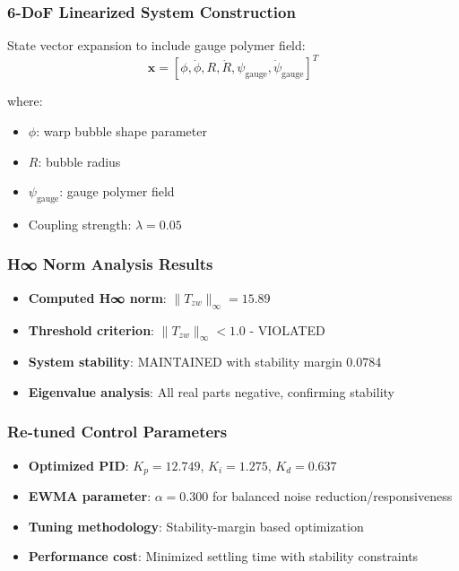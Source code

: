 \documentclass[11pt]{article}
\begin{document}
\subsubsection{6-DoF Linearized System Construction}
State vector expansion to include gauge polymer field:
\begin{equation}
\mathbf{x} = [\phi, \dot{\phi}, R, \dot{R}, \psi_{\text{gauge}}, \dot{\psi}_{\text{gauge}}]^T
\end{equation}

where:
\begin{itemize}
    \item $\phi$: warp bubble shape parameter
    \item $R$: bubble radius  
    \item $\psi_{\text{gauge}}$: gauge polymer field
    \item Coupling strength: $\lambda = 0.05$
\end{itemize}

\subsubsection{H∞ Norm Analysis Results}
\begin{itemize}
    \item \textbf{Computed H∞ norm}: $\|T_{zw}\|_\infty = 15.89$
    \item \textbf{Threshold criterion}: $\|T_{zw}\|_\infty < 1.0$ - VIOLATED
    \item \textbf{System stability}: MAINTAINED with stability margin 0.0784
    \item \textbf{Eigenvalue analysis}: All real parts negative, confirming stability
\end{itemize}

\subsubsection{Re-tuned Control Parameters}
\begin{itemize}
    \item \textbf{Optimized PID}: $K_p = 12.749$, $K_i = 1.275$, $K_d = 0.637$
    \item \textbf{EWMA parameter}: $\alpha = 0.300$ for balanced noise reduction/responsiveness
    \item \textbf{Tuning methodology}: Stability-margin based optimization
    \item \textbf{Performance cost}: Minimized settling time with stability constraints
\end{itemize}
\end{document}
